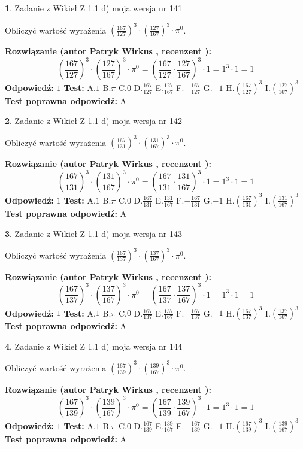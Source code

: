 \documentclass[12pt, a4paper]{article}
\theoremstyle{definition} %
\newtheorem{zad}{}
\newcommand{\zadStart}[1]{\begin{zad}#1\newline}
\newcommand{\zadStop}{\end{zad}}
\newcommand{\rozwStart}[2]{\noindent \textbf{Rozwiązanie (autor #1 , recenzent #2): }\newline}
\newcommand{\rozwStop}{\newline}
\newcommand{\odpStart}{\noindent \textbf{Odpowiedź:}\newline}
\newcommand{\odpStop}{\newline}
\newcommand{\testStart}{\noindent \textbf{Test:}\newline}
\newcommand{\testStop}{\newline}
\newcommand{\kluczStart}{\noindent \textbf{Test poprawna odpowiedź:}\newline}
\newcommand{\kluczStop}{\newline}
\begin{document}
\zadStart{Zadanie z Wikieł Z 1.1 d) moja wersja nr 141}

Obliczyć wartość wyrażenia $(\frac{167}{127})^{3} \cdot (\frac{127}{167})^{3} \cdot \pi^{0}$.
\zadStop
\rozwStart{Patryk Wirkus}{}
$$(\frac{167}{127})^{3} \cdot (\frac{127}{167})^{3} \cdot \pi^{0} = (\frac{167}{127} \cdot \frac{127}{167})^{3} \cdot 1 = 1^{3} \cdot 1 = 1$$
\rozwStop
\odpStart
$1$
\odpStop
\testStart
A.$1$ B.$\pi$ C.$0$ D.$\frac{167}{127}$ E.$\frac{127}{167}$
F.$-\frac{167}{127}$ G.$-1$
H.$(\frac{167}{127})^{3}$
I.$(\frac{127}{167})^{3}$
\testStop
\kluczStart
A
\kluczStop



\zadStart{Zadanie z Wikieł Z 1.1 d) moja wersja nr 142}

Obliczyć wartość wyrażenia $(\frac{167}{131})^{3} \cdot (\frac{131}{167})^{3} \cdot \pi^{0}$.
\zadStop
\rozwStart{Patryk Wirkus}{}
$$(\frac{167}{131})^{3} \cdot (\frac{131}{167})^{3} \cdot \pi^{0} = (\frac{167}{131} \cdot \frac{131}{167})^{3} \cdot 1 = 1^{3} \cdot 1 = 1$$
\rozwStop
\odpStart
$1$
\odpStop
\testStart
A.$1$ B.$\pi$ C.$0$ D.$\frac{167}{131}$ E.$\frac{131}{167}$
F.$-\frac{167}{131}$ G.$-1$
H.$(\frac{167}{131})^{3}$
I.$(\frac{131}{167})^{3}$
\testStop
\kluczStart
A
\kluczStop



\zadStart{Zadanie z Wikieł Z 1.1 d) moja wersja nr 143}

Obliczyć wartość wyrażenia $(\frac{167}{137})^{3} \cdot (\frac{137}{167})^{3} \cdot \pi^{0}$.
\zadStop
\rozwStart{Patryk Wirkus}{}
$$(\frac{167}{137})^{3} \cdot (\frac{137}{167})^{3} \cdot \pi^{0} = (\frac{167}{137} \cdot \frac{137}{167})^{3} \cdot 1 = 1^{3} \cdot 1 = 1$$
\rozwStop
\odpStart
$1$
\odpStop
\testStart
A.$1$ B.$\pi$ C.$0$ D.$\frac{167}{137}$ E.$\frac{137}{167}$
F.$-\frac{167}{137}$ G.$-1$
H.$(\frac{167}{137})^{3}$
I.$(\frac{137}{167})^{3}$
\testStop
\kluczStart
A
\kluczStop



\zadStart{Zadanie z Wikieł Z 1.1 d) moja wersja nr 144}

Obliczyć wartość wyrażenia $(\frac{167}{139})^{3} \cdot (\frac{139}{167})^{3} \cdot \pi^{0}$.
\zadStop
\rozwStart{Patryk Wirkus}{}
$$(\frac{167}{139})^{3} \cdot (\frac{139}{167})^{3} \cdot \pi^{0} = (\frac{167}{139} \cdot \frac{139}{167})^{3} \cdot 1 = 1^{3} \cdot 1 = 1$$
\rozwStop
\odpStart
$1$
\odpStop
\testStart
A.$1$ B.$\pi$ C.$0$ D.$\frac{167}{139}$ E.$\frac{139}{167}$
F.$-\frac{167}{139}$ G.$-1$
H.$(\frac{167}{139})^{3}$
I.$(\frac{139}{167})^{3}$
\testStop
\kluczStart
A
\kluczStop
\end{document}
